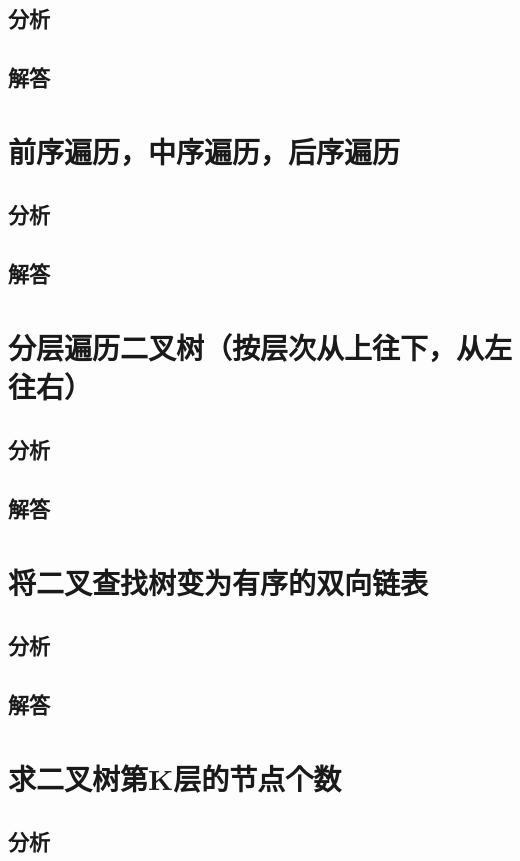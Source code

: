 \documentclass[UTF8,a4paper,12pt]{ctexbook}
\begin{document}
	\subsection{分析}
	
	\subsection{解答}
	
\section{前序遍历，中序遍历，后序遍历}
	\subsection{分析}
	
	\subsection{解答}
	
\section{分层遍历二叉树（按层次从上往下，从左往右）}
	\subsection{分析}
	
	\subsection{解答}
	
\section{将二叉查找树变为有序的双向链表}
	\subsection{分析}
	
	\subsection{解答}
	
\section{求二叉树第K层的节点个数}
	\subsection{分析}
	
\end{document}
